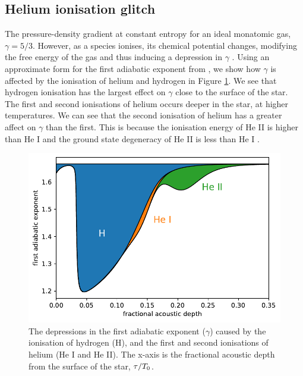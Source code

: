 \subsection{Helium ionisation glitch}\label{sec:helium-glitch}

The pressure-density gradient at constant entropy for an ideal monatomic gas, \(\gamma = 5/3\). However, as a species ionises, its chemical potential changes, modifying the free energy of the gas and thus inducing a depression in \(\gamma\) . Using an approximate form for the first adiabatic exponent from \citet{Houdayer.Reese.ea2021}, we show how \(\gamma\) is affected by the ionisation of helium and hydrogen in Figure \ref{fig:gamma-zones}. We see that hydrogen ionisation has the largest effect on \(\gamma\) close to the surface of the star. The first and second ionisations of helium occurs deeper in the star, at higher temperatures. We can see that the second ionisation of helium has a greater affect on \(\gamma\) than the first. This is because the ionisation energy of He II is higher than He I and the ground state degeneracy of He II is less than He I .

\begin{figure}
    \centering
    \includegraphics{figures/adiabatic-ionisation-regions.pdf}
    \caption{The depressions in the first adiabatic exponent (\(\gamma\)) caused by the ionisation of hydrogen (H), and the first and second ionisations of helium (He I and He II). The x-axis is the fractional acoustic depth from the surface of the star, \(\tau/{T_0}\).}
    \label{fig:gamma-zones}
\end{figure}

